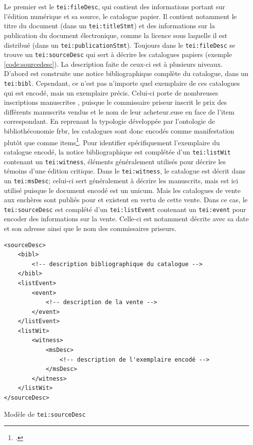 Le premier est le \texttt{tei:fileDesc}, qui contient des informations portant sur l'édition numérique et sa source, le catalogue papier. Il contient notamment le titre du document (dans un \texttt{tei:titleStmt}) et des informations sur la publication du document électronique, comme la licence sous laquelle il est distribué (dans un \texttt{tei:publicationStmt}). Toujours dans le \texttt{tei:fileDesc} se trouve un \texttt{tei:sourceDesc} qui sert à décrire les catalogues papiers (exemple \ref{code:sourcedesc}). La description faite de ceux-ci est à plusieurs niveaux. D'abord est construite une notice bibliographique complète du catalogue, dans un \texttt{tei:bibl}. Cependant, ce n'est pas n'importe quel exemplaire de ces catalogues qui est encodé, mais un exemplaire précis. Celui-ci porte de nombreuses inscriptions manuscrites , puisque le commissaire priseur inscrit le prix des différents manuscrits vendus et le nom de leur acheteur.euse en face de l'item correspondant. En reprenant la typologie développée par l'ontologie de bibliothéconomie \gls{frbr}, les catalogues sont donc encodés comme manifestation plutôt que comme items\footcite[p. 28]{rondeau_du_noyer_encoder_2019}. Pour identifier spécifiquement l'exemplaire du catalogue encodé, la notice bibliographique est complétée d'un \texttt{tei:listWit} contenant un \texttt{tei:witness}, éléments généralement utilisés pour décrire les témoins d'une édition critique. Dans le \texttt{tei:witness}, le catalogue est décrit dans un \texttt{tei:msDesc}; celui-ci sert généralement à décrire les manuscrits, mais est ici utilisé puisque le document encodé est un unicum. Mais les catalogues de vente aux enchères sont publiés pour et existent en vertu de cette vente. Dans ce cas, le \texttt{tei:sourceDesc} est complété d'un \texttt{tei:listEvent} contenant un \texttt{tei:event} pour encoder des informations sur la vente. Celle-ci est notamment décrite avec sa date et son adresse ainsi que le nom des commissaires priseurs.
	
\begin{listing}[h]
	\begin{verbatim}
<sourceDesc>
	<bibl>
		<!-- description bibliographique du catalogue -->
	</bibl>
	<listEvent>
		<event>
			<!-- description de la vente -->
		</event>
	</listEvent>
	<listWit>
		<witness>
			<msDesc>
				<!-- description de l'exemplaire encodé -->
			</msDesc>
		</witness>
	</listWit>
</sourceDesc>
	\end{verbatim}
	\caption{Modèle de \texttt{tei:sourceDesc}}
	\label{code:sourcedesc}
\end{listing}
	
